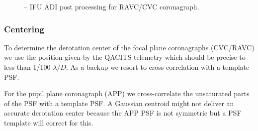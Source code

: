 \begin{figure}[hb]
  \centering
  \def \globalscale {0.400000}
  \fontsize{10}{12}\selectfont
  
  \caption[Recipe: ]{ -- IFU ADI post processing for RAVC/CVC coronagraph.
    }
  \label{fig:metis_ifu_adi_cgrph}
\end{figure}
\restoregeometry

\subsubsection{Centering}

To determine the derotation center of the focal plane coronagraphs (CVC/RAVC) we use the position given by the QACITS telemetry which should be precise to less than 1/100 $\lambda/D$. As a backup we resort to cross-correlation with a template PSF.

For the pupil plane coronagraph (APP) we cross-correlate the unsaturated parts of the PSF with a template PSF. A Gaussian centroid might not deliver an accurate derotation center because the APP PSF is not symmetric but a PSF template will correct for this.

